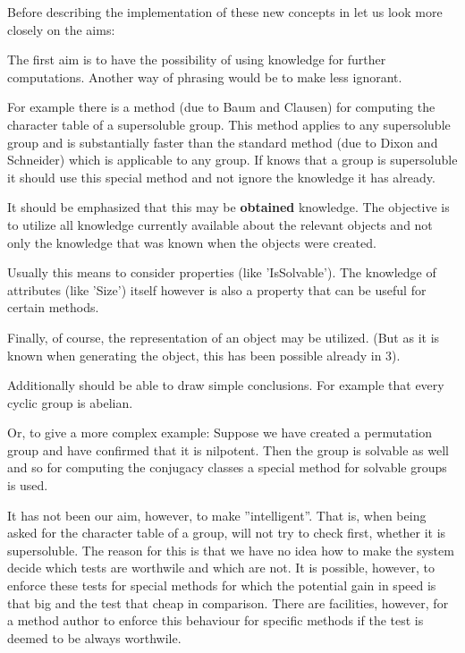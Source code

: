 
Before describing the implementation of these new concepts in {\GAP} let us
look more closely on the aims:


The first aim is to have the possibility of using knowledge for further
computations. Another way of phrasing would be to make {\GAP} less ignorant.

For example there is a method (due to Baum and Clausen) for computing the
character table of a supersoluble group. This method applies to any
supersoluble group and is substantially faster than the standard method (due
to Dixon and Schneider) which is applicable to any group. If {\GAP} knows that
a group is supersoluble it should use this special method and not ignore the
knowledge it has already.

It should be emphasized that this may be {\bf obtained} knowledge. The
objective is to utilize all knowledge currently available about the relevant
objects and not only the knowledge that was known when the objects were
created.

Usually this means to consider properties (like 'IsSolvable'). The
knowledge of attributes (like 'Size') itself however is also a property
that can be useful for certain methods.

Finally, of course, the representation of an object may be utilized. (But 
as it is known when generating the object, this has been possible already in
{\GAP} 3).

Additionally {\GAP} should be able to draw simple conclusions. For example that
every cyclic group is abelian.

Or, to give a more complex example: Suppose we have created a permutation
group and have confirmed that it is nilpotent. Then the group is solvable as
well and so for computing the conjugacy classes a special method for
solvable groups is used.

It has not been our aim, however, to make {\GAP} ''intelligent''. That is, when
being asked for the character table of a group, {\GAP} will not try to check
first, whether it is supersoluble. The reason for this is that we have no
idea how to make the system decide which tests are worthwile and which are
not. It is possible, however, to enforce these tests for special methods
for which the potential gain in speed is that big and the test that cheap
in comparison. There are facilities, however, for a method author to enforce
this behaviour for specific methods if the test is deemed to be always
worthwile.

